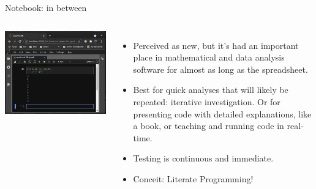 \documentclass[aspectratio=169]{beamer}
\begin{document}
\begin{frame}{Notebook: in between}
\vspace{0.2 cm}
\begin{columns}
\includegraphics[width=\linewidth]{../img/fundamental-3-modes-notebook.png}

\large
\begin{itemize}\setlength{\itemsep}{0.25 cm}
\item<1-> Perceived as new, but it's had an important place in mathematical and data analysis software for almost as long as the spreadsheet.
\item<2-> Best for quick analyses that will likely be repeated: iterative investigation. Or for presenting code with detailed explanations, like a book, or teaching and running code in real-time.
\item<3-> Testing is continuous and immediate.
\item<4-> Conceit: Literate Programming!
\end{itemize}
\end{columns}
\end{frame}
\end{document}
